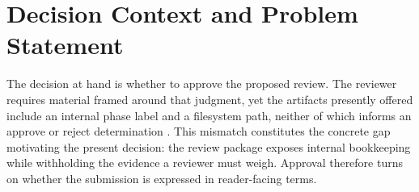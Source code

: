 \section{Decision Context and Problem Statement}

The decision at hand is whether to approve the proposed review. The reviewer requires material framed around that judgment, yet the artifacts presently offered include an internal phase label and a filesystem path, neither of which informs an approve or reject determination \cite{source001}. This mismatch constitutes the concrete gap motivating the present decision: the review package exposes internal bookkeeping while withholding the evidence a reviewer must weigh. Approval therefore turns on whether the submission is expressed in reader-facing terms.